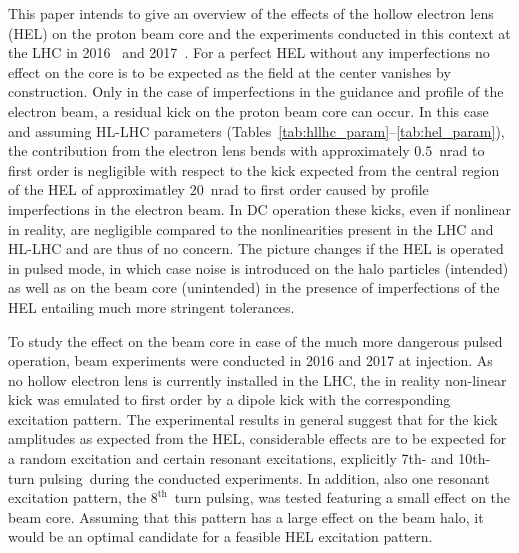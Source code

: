 \documentclass[%
 reprint,
 amsmath,amssymb,
 aps,
prstab,
longbibliography
]{revtex4-1}
\newcommand{\tenthtp}{10th-turn pulsing}
\begin{document}
This paper intends to give an overview of the effects of the hollow electron lens (HEL) on the proton beam core and the experiments conducted in this context at the LHC in 2016~\cite{resexmd2016} and 2017~\cite{resexmd2017}. For a perfect HEL without any imperfections no effect on the core is to be expected as the field at the center vanishes by construction. Only in the case of imperfections in the guidance and profile of the electron beam, a residual kick on the proton beam core can occur. In this case and assuming HL-LHC parameters (Tables~\ref{tab:hllhc_param}--\ref{tab:hel_param}), the contribution from the electron lens bends with approximately $0.5$~nrad to first order is negligible with respect to the kick expected from the central region of the HEL of approximatley $20$~nrad to first order caused by profile imperfections in the electron beam. In DC operation these kicks, even if nonlinear in reality, are negligible compared to the nonlinearities present in the LHC and HL-LHC and are thus of no concern. The picture changes if the HEL is operated in pulsed mode, in which case noise is introduced on the halo particles (intended) as well as on the beam core (unintended) in the presence of imperfections of the HEL entailing much more stringent tolerances.

To study the effect on the beam core in case of the much more dangerous pulsed operation, beam experiments were conducted in 2016 and 2017 at injection. As no hollow electron lens is currently installed in the LHC, the in reality non-linear kick was emulated to first order by a dipole kick with the corresponding excitation pattern. The experimental results in general suggest that for the kick amplitudes as expected from the HEL, considerable effects are to be expected for a random excitation and certain resonant excitations, explicitly 7th- and \tenthtp\ during the conducted experiments. In addition, also one resonant excitation pattern, the $8^{\mathrm{th}}$~turn pulsing, was tested featuring a small effect on the beam core. Assuming that this pattern has a large effect on the beam halo, it would be an optimal candidate for a feasible HEL excitation pattern.
\end{document}
